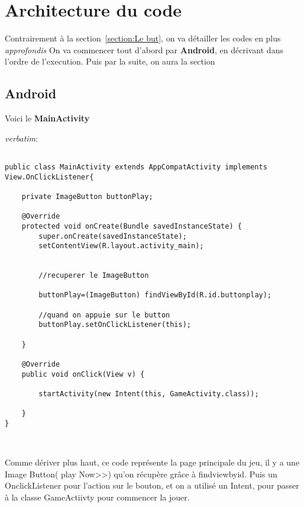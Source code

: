 \documentclass{article}
\begin{document}
\section{Architecture du code}
Contrairement à la section~\ref{section:Le but}, on va détailler les codes en plus \textit{approfondis}
On va commencer tout d'abord par \textbf{Android}, en décrivant dans l'ordre de l'execution.
Puis par la suite, on aura la section 

\subsection{Android} %

\smallskip
Voici le \textbf{MainActivity}

\textit{verbatim}:
\begin{verbatim}

public class MainActivity extends AppCompatActivity implements View.OnClickListener{

    private ImageButton buttonPlay;

    @Override
    protected void onCreate(Bundle savedInstanceState) {
        super.onCreate(savedInstanceState);
        setContentView(R.layout.activity_main);


        //recuperer le ImageButton

        buttonPlay=(ImageButton) findViewById(R.id.buttonplay);

        //quand on appuie sur le button
        buttonPlay.setOnClickListener(this);

    }

    @Override
    public void onClick(View v) {

        startActivity(new Intent(this, GameActivity.class));

    }
}



\end{verbatim}

\medskip

Comme dériver plus haut, ce code représente la page principale du jeu, il y a une Image Button( play Now>>) qu'on récupère grâce à findviewbyid. Puis un OnclickListener pour l'action sur le bouton, et on a utilisé un Intent, pour passer à la classe GameActiivty pour commencer la jouer.

\medskip
\end{document}
